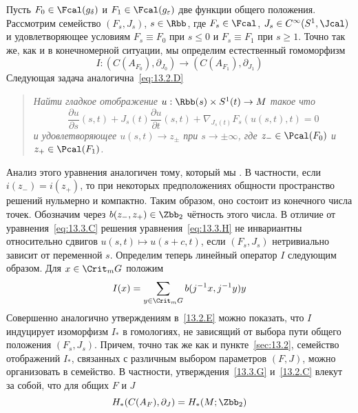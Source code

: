 Пусть $F_{0}\in\Fcal(g_{\delta})$ и $F_{1}\in\Fcal(g_{\epsilon})$ две
функции общего положения. 
Рассмотрим семейство $(F_{s}, J_{s})$, $s\in\Rbb$, где
$F_{s}\in\Fcal$, $J_{s}\in C^{\infty}(S^{1},\Jcal)$ и удовлетворяющее
условиям 
$F_{s}\equiv F_{0}$ при $s\leq0$ и $F_{s}\equiv F_{1}$ при $s\geq1$.
Точно так же, как и в конечномерной ситуации, мы определим
естественный гомоморфизм
\[
I:(C(A_{F_{0}}),\partial_{J_{0}})\to(C(A_{F_{1}}),\partial_{J_{1}})
\]
Следующая задача аналогична~\ref{eq:13.2.D}
\begin{quote}\em
  Найти гладкое отображение $u:\Rbb(s)\times S^{1}(t)\to M$
  такое что 
  \begin{equation}\label{eq:13.3.H}
    \frac{\partial u}{\partial s}(s,t)+
    J_{s}(t)\frac{\partial u}{\partial t}(s,t) +
    \nabla_{J_{s}(t)}F_{s}(u(s,t),t) = 0
  \end{equation}
  и удовлетворяющее $u(s,t)\to z_{\pm}$ при $s\to\pm\infty$, где
  $z_{-}\in\Pcal(F_{0})$ и $z_{+}\in\Pcal(F_{1})$.
\end{quote}
Анализ этого уравнения аналогичен тому, который мы .
В частности, если $i(z_{-})=i(z_{+})$, то при некоторых предположениях
общности пространство решений нульмерно и компактно. 
Таким образом, оно состоит из конечного числа точек.
Обозначим через $b(z_{-},z_{+})\in\Zbb_{2}$ чётность этого числа.
В отличие от уравнения~\ref{eq:13.3.C} решения
уравнения~\ref{eq:13.3.H} не инвариантны относительно сдвигов
$u(s,t)\mapsto u(s+c,t)$, если $(F_{s}, J_{s})$ нетривиально зависит
от переменной $s$.
Определим теперь линейный оператор $I$ следующим образом.
Для $x\in\Crit_{m}G$ положим
\[
I(x) = \sum_{y\in\Crit_{m}G}b(j^{-1}x,j^{-1}y)y
\]
Совершенно аналогично утверждениям в~\ref{13.2.E} можно показать, что
$I$ индуцирует изоморфизм $I_{*}$ в гомологиях, не зависящий от выбора
пути общего положения $(F_{s}, J_{s})$. 
Причем, точно так же как и пункте~\ref{sec:13.2}, семейство отображений
$I_{*}$, связанных с различным выбором параметров $(F,J)$, можно
организовать в  семейство.
В частности, утверждения~\ref{13.3.G} и~\ref{13.2.C} влекут за собой,
что для общих $F$ и $J$
\[
H_{*}(C(A_{F}),\partial_{J}) = H_{*}(M;\Zbb_{2})
\]

